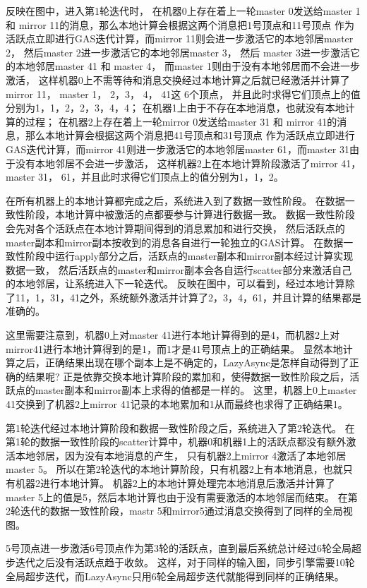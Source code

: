 反映在图中，进入第1轮迭代时，
在机器0上存在着上一轮master 0发送给master 1 和 mirror 11的消息，那么本地计算会根据这两个消息把1号顶点和11号顶点
作为活跃点立即进行GAS迭代计算，而mirror 11则会进一步激活它的本地邻居master 2，
然后master 2进一步激活它的本地邻居master 3， 然后 master 3进一步激活它的本地邻居master 41 和 master 4，
而master 1则由于没有本地邻居而不会进一步激活，
这样机器0上不需等待和消息交换经过本地计算之后就已经激活并计算了mirror 11， master 1， 2，3， 4， 41这 6个顶点，
并且此时求得它们顶点上的值分别为1，1，2，2，3，4，4；
在机器1上由于不存在本地消息，也就没有本地计算的过程；
在机器2上存在着上一轮mirror 0发送给master 31 和 mirror 41的消息，那么本地计算会根据这两个消息把41号顶点和31号顶点
作为活跃点立即进行GAS迭代计算，而mirror 41则进一步激活它的本地邻居master 61，而master 31由于没有本地邻居不会进一步激活，
这样机器2上在本地计算阶段激活了mirror 41， master 31， 61，并且此时求得它们顶点上的值分别为1，1，2。

在所有机器上的本地计算都完成之后，系统进入到了数据一致性阶段。
在数据一致性阶段，本地计算中被激活的点都要参与计算进行数据一致。
数据一致性阶段会先对各个活跃点在本地计算期间得到的消息累加和进行交换，
然后活跃点的master副本和mirror副本按收到的消息各自进行一轮独立的GAS计算。
在数据一致性阶段中运行apply部分之后，活跃点的master副本和mirror副本经过计算实现数据一致，
然后活跃点的master和mirror副本会各自运行scatter部分来激活自己的本地邻居，让系统进入下一轮迭代。
反映在图中，可以看到，经过本地计算除了11，1，31，41之外，系统额外激活并计算了2，3，4，61，并且计算的结果都是准确的。

这里需要注意到，机器0上对master 41进行本地计算得到的是4，而机器2上对mirror41进行本地计算得到的是1，而1才是41号顶点上的正确结果。
显然本地计算之后，正确结果出现在哪个副本上是不确定的，LazyAsync是怎样自动得到了正确的结果呢? 
正是依靠交换本地计算阶段的累加和，使得数据一致性阶段之后，活跃点的master副本和mirror副本上求得的值都是一样的。
这里，机器上0上master 41交换到了机器2上mirror 41记录的本地累加和1从而最终也求得了正确结果1。

第1轮迭代经过本地计算阶段和数据一致性阶段之后，系统进入了第2轮迭代。
在第1轮的数据一致性阶段的scatter计算中，机器0和机器1上的活跃点都没有额外激活本地邻居，因为没有本地消息的产生，
只有机器2上mirror 4激活了本地邻居master 5。
所以在第2轮迭代的本地计算阶段，只有机器2上有本地消息，也就只有机器2进行本地计算。
机器2上的本地计算处理完本地消息后激活并计算了master 5上的值是5，然后本地计算也由于没有需要激活的本地邻居而结束。
在第2轮迭代的数据一致性阶段，mastr 5和mirror5通过消息交换得到了同样的全局视图。

5号顶点进一步激活6号顶点作为第3轮的活跃点，直到最后系统总计经过6轮全局超步迭代之后没有活跃点趋于收敛。
这样，对于同样的输入图，同步引擎需要10轮全局超步迭代，而LazyAsync只用6轮全局超步迭代就能得到同样的正确结果。



